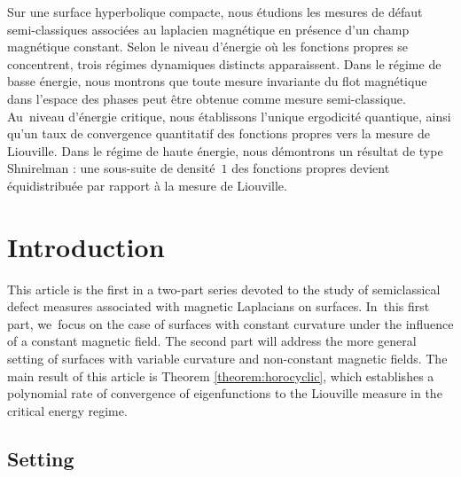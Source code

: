 \documentclass[JEP,XML,SOM,Unicode,published]{cedram}
\theoremstyle{plain}
\theoremstyle{definition}
\begin{document}
\begin{altabstract}
Sur une surface hyperbolique compacte, nous étudions les mesures de défaut semi-classiques associées au laplacien magnétique en présence d’un champ magnétique constant. Selon le \hbox{niveau} d’énergie où les fonctions propres se concentrent, trois régimes dynamiques distincts appa\-rais\-sent. Dans le régime de basse énergie, nous montrons que toute mesure invariante du flot magné\-tique dans l’espace des phases peut être obtenue comme mesure semi-classique. Au~\hbox{niveau} d’énergie critique, nous établissons l’unique ergodicité quantique, ainsi qu’un taux de convergence quantitatif des fonctions propres vers la mesure de Liouville. Dans le régime de haute énergie, nous démontrons un résultat de type Shnirelman : une sous-suite de densité~$1$ des fonctions propres devient équidistribuée par rapport à la mesure de Liouville.
\end{altabstract}

\maketitle

\tableofcontents


\section{Introduction}

This article is the first in a two-part series devoted to the study of semiclassical defect measures associated with magnetic Laplacians on surfaces. In~this first part, we~focus on the case of surfaces with constant curvature under the influence of a constant magnetic field. The second part \cite{Charles-Lefeuvre-25-2} will address the more general setting of surfaces with variable curvature and non-constant magnetic fields. The main result of this article is Theorem \ref{theorem:horocyclic}, which establishes a polynomial rate of convergence of eigenfunctions to the Liouville measure in the critical energy regime.

\subsection{Setting}
\end{document}

